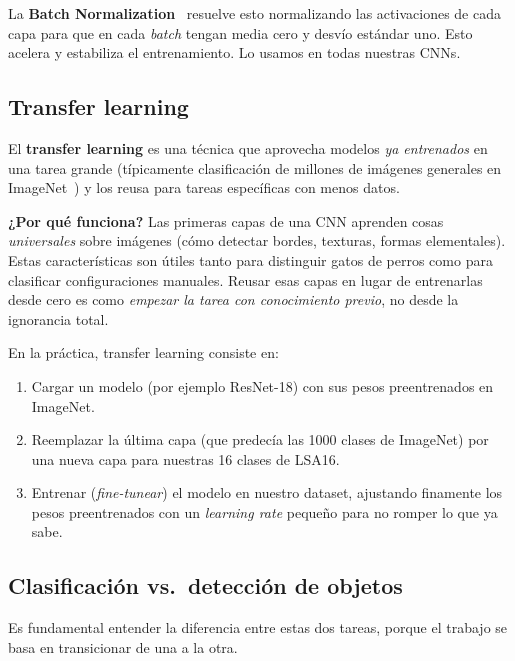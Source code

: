 \documentclass[a4paper,11pt]{article}
\begin{document}
La \textbf{Batch Normalization}~\cite{ioffe2015batch} resuelve esto normalizando las activaciones de cada capa para que en cada \textit{batch} tengan media cero y desvío estándar uno. Esto acelera y estabiliza el entrenamiento. Lo usamos en todas nuestras CNNs.

\subsection{Transfer learning}
\label{sec:transfer}

El \textbf{transfer learning} es una técnica que aprovecha modelos \emph{ya entrenados} en una tarea grande (típicamente clasificación de millones de imágenes generales en ImageNet~\cite{deng2009imagenet}) y los reusa para tareas específicas con menos datos.

\begin{concepto}
\textbf{¿Por qué funciona?} Las primeras capas de una CNN aprenden cosas \emph{universales} sobre imágenes (cómo detectar bordes, texturas, formas elementales). Estas características son útiles tanto para distinguir gatos de perros como para clasificar configuraciones manuales. Reusar esas capas en lugar de entrenarlas desde cero es como \emph{empezar la tarea con conocimiento previo}, no desde la ignorancia total.
\end{concepto}

En la práctica, transfer learning consiste en:
\begin{enumerate}[itemsep=2pt]
    \item Cargar un modelo (por ejemplo ResNet-18) con sus pesos preentrenados en ImageNet.
    \item Reemplazar la última capa (que predecía las 1000 clases de ImageNet) por una nueva capa para nuestras 16 clases de LSA16.
    \item Entrenar (\textit{fine-tunear}) el modelo en nuestro dataset, ajustando finamente los pesos preentrenados con un \textit{learning rate} pequeño para no romper lo que ya sabe.
\end{enumerate}

\subsection{Clasificación vs.\ detección de objetos}
\label{sec:cls-vs-det}

Es fundamental entender la diferencia entre estas dos tareas, porque el trabajo se basa en transicionar de una a la otra.
\end{document}
